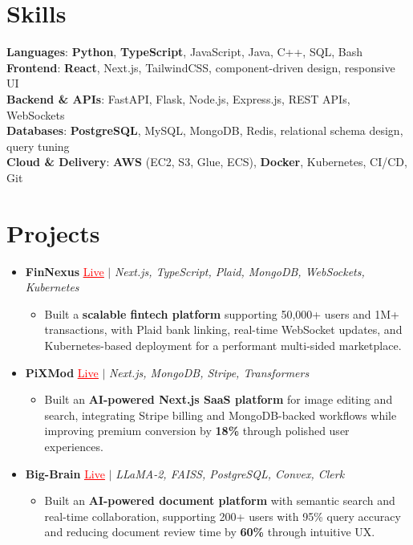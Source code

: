 \documentclass[letterpaper,10pt]{article}
\newcommand{\resumeItem}[1]{\item\small{{#1 \vspace{-2pt}}}}
\newcommand{\resumeProjectHeading}[1]{\item \small #1 \vspace{-2pt}}
\newcommand{\resumeSubHeadingListStart}{\begin{itemize}[leftmargin=0.0in, label={}]}
\newcommand{\resumeSubHeadingListEnd}{\end{itemize}}
\newcommand{\resumeProjItemListStart}{\begin{itemize}[leftmargin=0.15in,label=\textbullet,itemsep=0pt,topsep=0pt,parsep=0pt,partopsep=0pt]}
\newcommand{\resumeProjItemListEnd}{\end{itemize}\vspace{-4pt}}
\begin{document}
\section{Skills}
\begin{itemize}[leftmargin=0.15in, label={}]
\small{\item{
\textbf{Languages}: \textbf{Python}, \textbf{TypeScript}, JavaScript, Java, C++, SQL, Bash \\
\textbf{Frontend}: \textbf{React}, Next.js, TailwindCSS, component-driven design, responsive UI \\
\textbf{Backend \& APIs}: FastAPI, Flask, Node.js, Express.js, REST APIs, WebSockets \\
\textbf{Databases}: \textbf{PostgreSQL}, MySQL, MongoDB, Redis, relational schema design, query tuning \\
\textbf{Cloud \& Delivery}: \textbf{AWS} (EC2, S3, Glue, ECS), \textbf{Docker}, Kubernetes, CI/CD, Git
}}
\end{itemize}
\vspace{-16pt}
\section{Projects}
\resumeSubHeadingListStart
\vspace{-2pt}
\resumeProjectHeading{\textbf{FinNexus} {\href{https://fin-nexus.vercel.app/}{\textcolor{red}{\underline{Live}}}} $|$ \emph{Next.js, TypeScript, Plaid, MongoDB, WebSockets, Kubernetes}}
\resumeProjItemListStart
\resumeItem{Built a \textbf{scalable fintech platform} supporting 50,000+ users and 1M+ transactions, with Plaid bank linking, real-time WebSocket updates, and Kubernetes-based deployment for a performant multi-sided marketplace.}
\resumeProjItemListEnd
\vspace{3pt}
\resumeProjectHeading{\textbf{PiXMod} {\href{https://pixmod.vercel.app/}{\textcolor{red}{\underline{Live}}}} $|$ \emph{Next.js, MongoDB, Stripe, Transformers}}
\resumeProjItemListStart
\resumeItem{Built an \textbf{AI-powered Next.js SaaS platform} for image editing and search, integrating Stripe billing and MongoDB-backed workflows while improving premium conversion by \textbf{18\%} through polished user experiences.}
\resumeProjItemListEnd
\vspace{3pt}
\resumeProjectHeading{\textbf{Big-Brain} {\href{https://big-brain-pied.vercel.app/}{\textcolor{red}{\underline{Live}}}} $|$ \emph{LLaMA-2, FAISS, PostgreSQL, Convex, Clerk}}
\resumeProjItemListStart
\resumeItem{Built an \textbf{AI-powered document platform} with semantic search and real-time collaboration, supporting 200+ users with 95\% query accuracy and reducing document review time by \textbf{60\%} through intuitive UX.}
\resumeProjItemListEnd
\resumeSubHeadingListEnd
\end{document}
